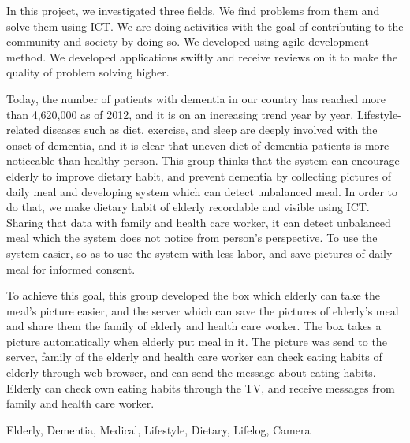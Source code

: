 \documentclass[../report]{subfiles}
\begin{document}
\begin{eabstract}
In this project, we investigated three fields.
We find problems from them and solve them using ICT.
We are doing activities with the goal of contributing to the community and society by doing so.
We developed using agile development method.
We developed applications swiftly and receive reviews on it to make the quality of problem solving higher.

Today, the number of patients with dementia in our country has reached more than 4,620,000 as of 2012, and it is on an increasing trend year by year.
Lifestyle-related diseases such as diet, exercise, and sleep are deeply involved with the onset of dementia, and it is clear that uneven diet of dementia patients is more noticeable than healthy person.
This group thinks that the system can encourage elderly to improve dietary habit, and prevent dementia by collecting pictures of daily meal and developing system which can detect unbalanced meal.
In order to do that, we make dietary habit of elderly recordable and visible using ICT.
Sharing that data with family and health care worker, it can detect unbalanced meal which the system does not notice from person's perspective.
To use the system easier, so as to use the system with less labor, and save pictures of daily meal for informed consent.

To achieve this goal, this group developed the box which elderly can take the meal's picture easier, and the server which can save the pictures of elderly's meal and share them the family of elderly and health care worker.
The box takes a picture automatically when elderly put meal in it.
The picture was send to the server, family of the elderly and health care worker can check eating habits of elderly through web browser, and can send the message about eating habits.
Elderly can check own eating habits through the TV, and receive messages from family and health care worker.

\begin{ekeyword}
Elderly, Dementia, Medical, Lifestyle, Dietary, Lifelog, Camera
\end{ekeyword}
\end{eabstract}
\end{document}
